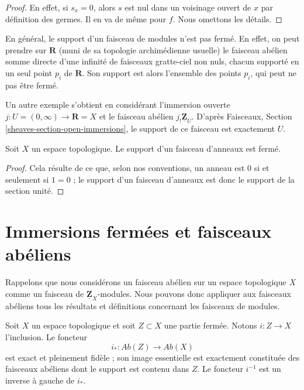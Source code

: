 \begin{proof}
En effet, si $s_x = 0$, alors $s$ est nul dans un voisinage ouvert de $x$ par
définition des germes. Il en va de même pour $f$. Nous omettons les détails.
\end{proof}

\noindent
En général, le support d'un faisceau de modules n'est pas fermé. En effet, on
peut prendre sur $\mathbf{R}$ (muni de sa topologie archimédienne usuelle) le
faisceau abélien somme directe d'une infinité de faisceaux gratte-ciel non nuls,
chacun supporté en un seul point $p_i$ de $\mathbf{R}$. Son support est alors
l'ensemble des points $p_i$, qui peut ne pas être fermé.

\medskip\noindent
Un autre exemple s'obtient en considérant l'immersion ouverte
$j : U = (0 , \infty) \to \mathbf{R} = X$ et le faisceau abélien
$j_!\underline{\mathbf{Z}}_U$. D'après Faisceaux, Section
\ref{sheaves-section-open-immersions}, le support de ce faisceau est exactement
$U$.

\begin{lemma}
\label{lemma-support-sheaf-rings-closed}
Soit $X$ un espace topologique. Le support d'un faisceau d'anneaux est fermé.
\end{lemma}

\begin{proof}
Cela résulte de ce que, selon nos conventions, un anneau est $0$ si et seulement
si $1 = 0$ ; le support d'un faisceau d'anneaux est donc le support de la
section unité.
\end{proof}






\section{Immersions fermées et faisceaux abéliens}
\label{section-closed-immersions}

\noindent
Rappelons que nous considérons un faisceau abélien sur un espace topologique
$X$ comme un faisceau de $\underline{\mathbf{Z}}_X$-modules. Nous pouvons donc
appliquer aux faisceaux abéliens tous les résultats et définitions concernant
les faisceaux de modules.

\begin{lemma}
\label{lemma-i-star-exact}
Soit $X$ un espace topologique et soit $Z \subset X$ une partie fermée.
Notons $i : Z \to X$ l'inclusion. Le foncteur
$$
i_* : \textit{Ab}(Z) \longrightarrow \textit{Ab}(X)
$$
est exact et pleinement fidèle ; son image essentielle est exactement
constituée des faisceaux abéliens dont le support est contenu dans $Z$. Le
foncteur $i^{-1}$ est un inverse à gauche de $i_*$.
\end{lemma}

